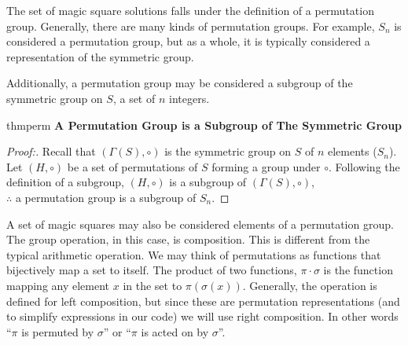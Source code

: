 \documentclass[12pt]{report}
\begin{document}
\par The set of magic square solutions falls under the definition of a permutation group.
Generally, there are many kinds of permutation groups. For example, $S_n$ is considered a
permutation group, but as a whole, it is typically considered a representation of the symmetric
group.


\par Additionally, a permutation group may be considered a subgroup of the symmetric group on $S$,
a set of $n$ integers\cite{Whitelaw}.

\singlespacing{}
\begin{thmbox}{}{thmperm}
  \textbf{A Permutation Group is a Subgroup of The Symmetric Group}
  \begin{proof}[Proof:]
    Recall that $\left(\varGamma\left(S\right), \circ \right)$ is the symmetric group on $S$ of $n$
    elements ($S_n$). Let $\left(H,\circ\right)$ be a set of permutations of $S$ forming a group
    under
    $\circ$. Following the definition of a subgroup, $\left(H,\circ\right)$ is a subgroup of
    $\left(\varGamma\left(S\right), \circ \right)$,\\ $\therefore$ a permutation group is a
    subgroup of
    $S_n$.
  \end{proof}
\end{thmbox}
\doublespacing{}

\par A set of magic squares may also be considered elements of a permutation group. The group
operation, in this case, is composition. This is different from the typical arithmetic operation.
We may think of permutations as functions that bijectively map a set to itself. The product of two
functions, $\pi\cdot\sigma$ is the function mapping any element $x$ in the set to
$\pi\left(\sigma\left(x\right)\right)$. Generally, the operation is defined for left composition,
but since these are permutation representations (and to simplify expressions in our code) we will
use right composition. In other words ``$\pi$ is permuted by $\sigma$'' or ``$\pi$ is acted on by
$\sigma$''.
\end{document}

